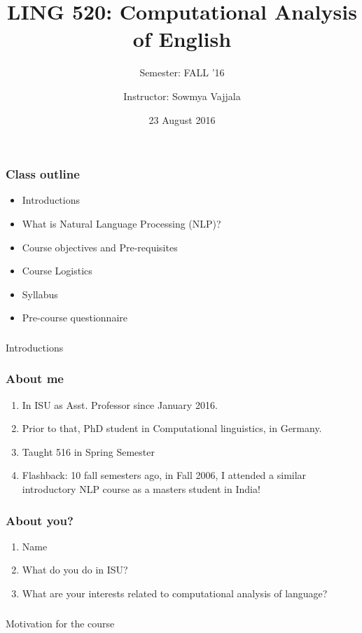 \documentclass{beamer}
\author[Sowmya Vajjala]{Instructor: Sowmya Vajjala}
\title[LING 520]{LING 520: Computational Analysis of English}
\subtitle{Semester: FALL '16}
\date{23 August 2016}
\institute{Iowa State University, USA}
\begin{document}
\begin{frame}\titlepage
\end{frame}

\begin{frame}
\frametitle{Class outline}
\begin{itemize}
\item Introductions %
\item What is Natural Language Processing (NLP)? %
\item Course objectives and Pre-requisites %
\item Course Logistics %
\item Syllabus %
\item Pre-course questionnaire %
\end{itemize}
\end{frame}

\begin{frame}
\frametitle{}
\begin{center}
\Large Introductions
\end{center}
\end{frame}

\begin{frame}
\frametitle{About me}
\begin{enumerate}
\item In ISU as Asst. Professor since January 2016.
\item Prior to that, PhD student in Computational linguistics, in Germany.
\item Taught 516 in Spring Semester
\item Flashback: 10 fall semesters ago, in Fall 2006, I attended a similar introductory NLP course as a masters student in India!
\end{enumerate}
\end{frame}

\begin{frame}
\frametitle{About you?}
\begin{enumerate}
\item Name
\item What do you do in ISU?
\item What are your interests related to computational analysis of language?
\end{enumerate}
\end{frame}

\begin{frame}
\frametitle{}
\begin{center}
\Large Motivation for the course
\end{center}
\end{frame}
\end{document}
